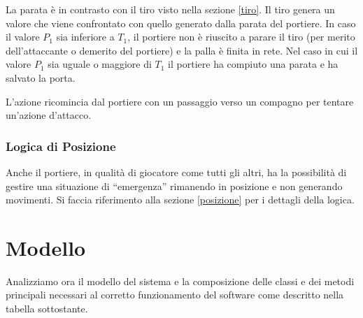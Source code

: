 \documentclass[aps,letterpaper,10pt]{article}
\begin{document}
La parata \`e in contrasto con il tiro visto nella sezione \ref{tiro}. Il tiro genera un valore che viene confrontato con quello generato dalla parata del portiere. In caso il valore $P_1$ sia inferiore a $T_1$, il portiere non \`e riuscito a parare il tiro (per merito dell'attaccante o demerito del portiere) e la palla \`e finita in rete. Nel caso in cui il valore $P_1$ sia uguale o maggiore di $T_1$ il portiere ha compiuto una parata e ha salvato la porta. \vspace{3mm}

L'azione ricomincia dal portiere con un passaggio verso un compagno per tentare un'azione d'attacco.

\subsubsection{Logica di Posizione}

Anche il portiere, in qualit\`a di giocatore come tutti gli altri, ha la possibilit\`a di gestire una situazione di ``emergenza'' rimanendo in posizione e non generando movimenti. Si faccia riferimento alla sezione \ref{posizione} per i dettagli della logica.

\newpage

\section{Modello}

Analizziamo ora il modello del sistema e la composizione delle classi e dei metodi principali necessari al corretto funzionamento del software come descritto nella tabella sottostante. \vspace{3mm}
\end{document}
